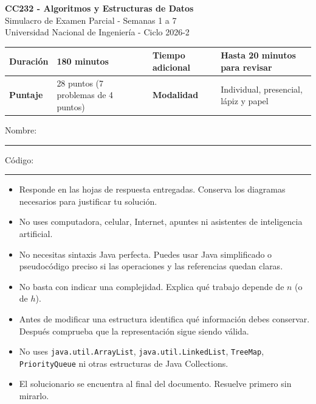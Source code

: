 \documentclass[11pt,a4paper]{article}
\begin{document}
\begin{center}
{\LARGE\bfseries CC232 - Algoritmos y Estructuras de Datos}\\[4pt]
{\large Simulacro de Examen Parcial - Semanas 1 a 7}\\[2pt]
{\small Universidad Nacional de Ingeniería - Ciclo 2026-2}
\end{center}

\vspace{2pt}
\begin{tabularx}{\textwidth}{|l|X|l|X|}
\hline
\textbf{Duración} & 180 minutos & \textbf{Tiempo adicional} & Hasta 20 minutos para revisar \\ \hline
\textbf{Puntaje} & 28 puntos (7 problemas de 4 puntos) & \textbf{Modalidad} & Individual, presencial, lápiz y papel \\ \hline
\end{tabularx}

\vspace{8pt}
Nombre: \rule{9cm}{0.4pt} \hfill Código: \rule{3.5cm}{0.4pt}

\begin{tcolorbox}[enhanced,sharp corners,colback=white,colframe=black!70,boxrule=0.5pt,title=Indicaciones,coltitle=black,colbacktitle=black!8,fonttitle=\bfseries]
\begin{itemize}[leftmargin=12pt,itemsep=1pt,topsep=0pt]
\item Responde en las hojas de respuesta entregadas. Conserva los diagramas necesarios para justificar tu solución.
\item No uses computadora, celular, Internet, apuntes ni asistentes de inteligencia artificial.
\item No necesitas sintaxis Java perfecta. Puedes usar Java simplificado o pseudocódigo preciso si las operaciones y las referencias quedan claras.
\item No basta con indicar una complejidad. Explica qué trabajo depende de $n$ (o de $h$).
\item Antes de modificar una estructura identifica qué información debes conservar. Después comprueba que la representación sigue siendo válida.
\item No uses \texttt{java.util.ArrayList}, \texttt{java.util.LinkedList}, \texttt{TreeMap}, \texttt{PriorityQueue} ni otras estructuras de Java Collections.
\item El solucionario se encuentra al final del documento. Resuelve primero sin mirarlo.
\end{itemize}
\end{tcolorbox}
\end{document}
